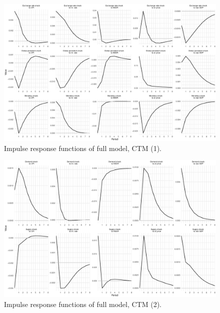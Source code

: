 \documentclass{beamer}
\begin{document}
\begin{frame}[noframenumbering]
	\label{fullirfs}
	\begin{figure}[h!]
		\centering
		\includegraphics[width=1\linewidth]{../Text/figures/irf_1}
		\caption[]{Impulse response functions of full model, CTM (1).}
		\label{fig:irf_1}
	\end{figure}
 
\end{frame}

\begin{frame}[noframenumbering]
	\begin{figure}[h!]
		\centering
		\includegraphics[width=1\linewidth]{../Text/figures/irf_2}
		\caption[]{Impulse response functions of full model, CTM (2).}
		\label{fig:irf_2}
	\end{figure}
\end{frame}
\end{document}
